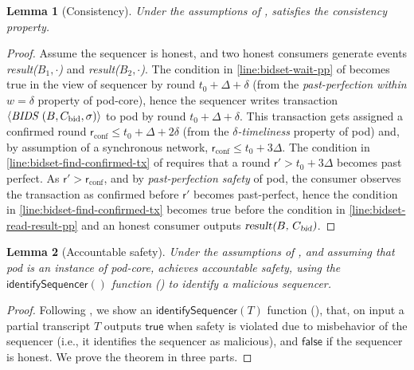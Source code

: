 \documentclass[pdflatex,sn-mathphys-num]{sn-jnl}%
\theoremstyle{thmstyleone}%
\theoremstyle{thmstyletwo}%
\theoremstyle{thmstylethree}%
\newtheorem{lemma}{Lemma}
\newcommand{\podtm}{\textsf{pod}\xspace}
\newcommand{\bidcert}{\ensuremath{C_\text{bid}}\xspace}
\newcommand{\true}{\mathsf{true}}
\newcommand{\false}{\mathsf{false}}
\newcommand{\op}[1]{\textsl{#1}}
\newcommand{\operand}[1]{\textsf{#1}}
\newcommand{\round}{\operand{r}\xspace}
\newcommand{\rconf}{\ensuremath{\round_\text{conf}}\xspace}
\newcommand{\identifySequencer}[1]{\ensuremath{\mathsf{identifySequencer}(#1)}\xspace}
\newcommand{\parConf}{\ensuremath{u}\xspace}
\newcommand{\parPerf}{\ensuremath{w}\xspace}
\newcommand{\tran}{\ensuremath{T}\xspace}
\newcommand{\msg}[2]{\ensuremath{\langle\textit{\uppercase{#1 }}#2\rangle}\xspace}
\newcommand{\msgbidresult}[1]{\msg{bids}{ #1}}
\newcommand{\tzero}{\ensuremath{t_0}\xspace}
\newcommand{\bag}{\ensuremath{B}\xspace}
\newcommand{\opResult}[1]{\op{result(#1)}\xspace}
\newcommand{\podInst}{\textit{pod}\xspace}
\begin{document}
\begin{appendices}
\begin{lemma}[Consistency]\label{lem:bidset-consistencys}
    Under the assumptions of ,  satisfies the \emph{consistency} property.
\end{lemma}
\begin{proof}
    Assume the sequencer is honest, and two honest consumers generate events \opResult{$\bag_1, \cdot$} and \opResult{$\bag_2, \cdot$}.
    The condition in \cref{line:bidset-wait-pp} of  becomes true in the view of sequencer by round $\tzero + \Delta + \delta$ (from the \emph{past-perfection within $\parPerf=\delta$} property of \podtm-core),
    hence the sequencer writes transaction \msgbidresult{(\bag, \bidcert, \sigma)} to \podtm by round $\tzero + \Delta + \delta$.
    This transaction gets assigned a confirmed round $\rconf \leq \tzero + \Delta + 2\delta$ (from the \emph{$\delta$-timeliness} property of \podtm) and,
    by assumption of a synchronous network, $\rconf \leq \tzero + 3 \Delta$.
    The condition in \cref{line:bidset-find-confirmed-tx} of  requires that a round $\round' > \tzero + 3 \Delta$ becomes past perfect.
    As $\round' > \rconf$, and by \emph{past-perfection safety} of \podtm, the consumer observes the transaction as confirmed before $\round'$ becomes past-perfect, hence the condition in \cref{line:bidset-find-confirmed-tx} becomes true before the condition in \cref{line:bidset-read-result-pp} and an honest consumer outputs $\opResult{\bag, \bidcert}$.
\end{proof}

\begin{lemma}[Accountable safety]\label{lem:bidset-accountability}
    Under the assumptions of , and assuming that \podInst is an instance of \podtm-core,  achieves \emph{accountable safety}, using the \identifySequencer{} function () to identify a malicious sequencer.
\end{lemma}
\begin{proof}
    Following , we show an \identifySequencer{\tran} function (), that, on input a partial transcript \tran outputs $\true$ when safety is violated due to misbehavior of the sequencer (i.e., it identifies the sequencer as malicious), and $\false$ if the sequencer is honest.
    We prove the theorem in three parts.


\end{proof}
\end{appendices}
\end{document}
